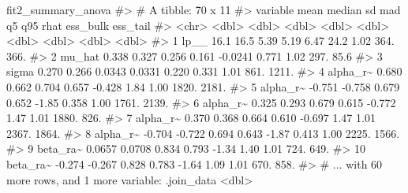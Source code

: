 \documentclass[
  11pt,
  letterpaper,
  DIV=11,
  numbers=noendperiod]{scrartcl}
\newenvironment{Shaded}{}{}
\newcommand{\CommentTok}[1]{\textcolor[rgb]{0.42,0.45,0.49}{#1}}
\newcommand{\NormalTok}[1]{\textcolor[rgb]{0.14,0.16,0.18}{#1}}
\begin{document}
\begin{Shaded}
\begin{Highlighting}[]
\NormalTok{fit2\_summary\_anova}
\CommentTok{\#\textgreater{} \# A tibble: 70 x 11}
\CommentTok{\#\textgreater{}    variable    mean  median     sd    mad      q5    q95  rhat ess\_bulk ess\_tail}
\CommentTok{\#\textgreater{}    \textless{}chr\textgreater{}      \textless{}dbl\textgreater{}   \textless{}dbl\textgreater{}  \textless{}dbl\textgreater{}  \textless{}dbl\textgreater{}   \textless{}dbl\textgreater{}  \textless{}dbl\textgreater{} \textless{}dbl\textgreater{}    \textless{}dbl\textgreater{}    \textless{}dbl\textgreater{}}
\CommentTok{\#\textgreater{}  1 lp\_\_     16.1    16.5    5.39   5.19    6.47   24.2    1.02     364.    366. }
\CommentTok{\#\textgreater{}  2 mu\_hat    0.338   0.327  0.256  0.161  {-}0.0241  0.771  1.02     297.     85.6}
\CommentTok{\#\textgreater{}  3 sigma     0.270   0.266  0.0343 0.0331  0.220   0.331  1.01     861.   1211. }
\CommentTok{\#\textgreater{}  4 alpha\_r\textasciitilde{}  0.680   0.662  0.704  0.657  {-}0.428   1.84   1.00    1820.   2181. }
\CommentTok{\#\textgreater{}  5 alpha\_r\textasciitilde{} {-}0.751  {-}0.758  0.679  0.652  {-}1.85    0.358  1.00    1761.   2139. }
\CommentTok{\#\textgreater{}  6 alpha\_r\textasciitilde{}  0.325   0.293  0.679  0.615  {-}0.772   1.47   1.01    1880.    826. }
\CommentTok{\#\textgreater{}  7 alpha\_r\textasciitilde{}  0.370   0.368  0.664  0.610  {-}0.697   1.47   1.01    2367.   1864. }
\CommentTok{\#\textgreater{}  8 alpha\_r\textasciitilde{} {-}0.704  {-}0.722  0.694  0.643  {-}1.87    0.413  1.00    2225.   1566. }
\CommentTok{\#\textgreater{}  9 beta\_ra\textasciitilde{}  0.0657  0.0708 0.834  0.793  {-}1.34    1.40   1.01     724.    649. }
\CommentTok{\#\textgreater{} 10 beta\_ra\textasciitilde{} {-}0.274  {-}0.267  0.828  0.783  {-}1.64    1.09   1.01     670.    858. }
\CommentTok{\#\textgreater{} \# ... with 60 more rows, and 1 more variable: .join\_data \textless{}dbl\textgreater{}}
\end{Highlighting}
\end{Shaded}
\end{document}
